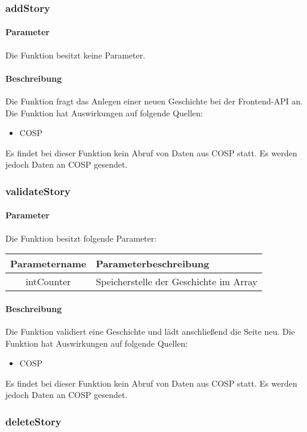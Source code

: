 \subsubsection{addStory}
\paragraph{Parameter} Die Funktion besitzt keine Parameter.
\paragraph{Beschreibung} Die Funktion fragt das Anlegen einer neuen Geschichte bei der Frontend-API an. Die Funktion hat Auswirkungen auf folgende Quellen:
\begin{itemize}
	\item COSP
\end{itemize}
Es findet bei dieser Funktion kein Abruf von Daten aus {\glqq COSP\grqq} statt. Es werden jedoch Daten an {\glqq COSP\grqq} gesendet.
\subsubsection{validateStory}
\paragraph{Parameter} Die Funktion besitzt folgende Parameter:
\begin{table}[H]
	\begin{tabular}{|c|p{11cm}|}
		\hline
		\textbf{Parametername} & \textbf{Parameterbeschreibung} \\ \hline
		intCounter & Speicherstelle der Geschichte im Array \\ \hline
	\end{tabular}
\end{table}
\paragraph{Beschreibung} Die Funktion validiert eine Geschichte und lädt anschließend die Seite neu. Die Funktion hat Auswirkungen auf folgende Quellen:
\begin{itemize}
	\item COSP
\end{itemize}
Es findet bei dieser Funktion kein Abruf von Daten aus {\glqq COSP\grqq} statt. Es werden jedoch Daten an {\glqq COSP\grqq} gesendet.
\subsubsection{deleteStory}
